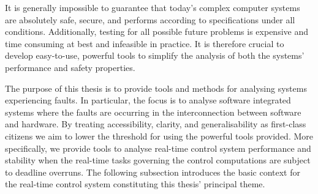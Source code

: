 It is generally impossible to guarantee that today's complex computer systems are absolutely safe, secure, and performs according to specifications under all conditions.
Additionally, testing for all possible future problems is expensive and time consuming at best and infeasible in practice.
It is therefore crucial to develop easy-to-use, powerful tools to simplify the analysis of both the systems' performance and safety properties.

The purpose of this thesis is to provide tools and methods for analysing systems experiencing faults.
In particular, the focus is to analyse software integrated systems where the faults are occurring in the interconnection between software and hardware.
By treating accessibility, clarity, and generalisability as first-class citizens we aim to lower the threshold for using the powerful tools provided.
More specifically, we provide tools to analyse real-time control system performance and stability when the real-time tasks governing the control computations are subject to deadline overruns.
The following subsection introduces the basic context for the real-time control system constituting this thesis' principal theme.



